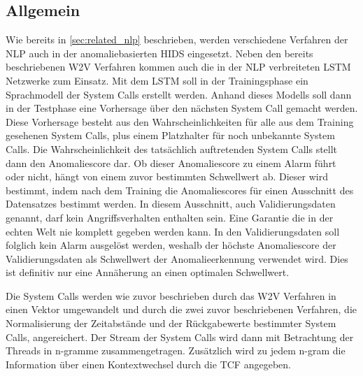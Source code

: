         \subsection{Allgemein}\label{sec:Allgemein}
            Wie bereits in \autoref{sec:related_nlp} beschrieben, werden verschiedene Verfahren der \ac{NLP} auch in der anomaliebasierten \ac{HIDS} eingesetzt.
            Neben den bereits beschriebenen \ac{W2V} Verfahren kommen auch die in der \ac{NLP} verbreiteten \ac{LSTM} Netzwerke zum Einsatz.
            Mit dem \ac{LSTM} soll in der Trainingsphase ein Sprachmodell der System Calls erstellt werden.
            Anhand dieses Modells soll dann in der Testphase eine Vorhersage über den nächsten System Call gemacht werden.
            Diese Vorhersage besteht aus den Wahrscheinlichkeiten für alle aus dem Training gesehenen System Calls, plus einem Platzhalter für noch unbekannte System Calls.
            Die Wahrscheinlichkeit des tatsächlich auftretenden System Calls stellt dann den Anomaliescore dar.
            Ob dieser Anomaliescore zu einem Alarm führt oder nicht, hängt von einem zuvor bestimmten Schwellwert ab.
            Dieser wird bestimmt, indem nach dem Training die Anomaliescores für einen Ausschnitt des Datensatzes bestimmt werden.
            In diesem Ausschnitt, auch Validierungsdaten genannt, darf kein Angriffsverhalten enthalten sein.
            Eine Garantie die in der echten Welt nie komplett gegeben werden kann.
            In den Validierungsdaten soll folglich kein Alarm ausgelöst werden, weshalb der höchste Anomaliescore der Validierungsdaten als Schwellwert der Anomalieerkennung verwendet wird.
            Dies ist definitiv nur eine Annäherung an einen optimalen Schwellwert.

            Die System Calls werden wie zuvor beschrieben durch das \ac{W2V} Verfahren in einen Vektor umgewandelt und durch die zwei zuvor beschriebenen Verfahren, die Normalisierung der Zeitabstände und der Rückgabewerte bestimmter System Calls, angereichert.
            Der Stream der System Calls wird dann mit Betrachtung der Threads in n-gramme zusammengetragen.
            Zusätzlich wird zu jedem n-gram die Information über einen Kontextwechsel durch die \ac{TCF} angegeben.


